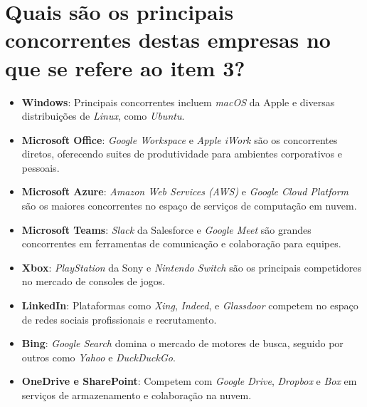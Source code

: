 \section{Quais são os principais concorrentes destas empresas no que se refere ao item 3?}

\begin{itemize}
    \item \textbf{Windows}: Principais concorrentes incluem \textit{macOS} da Apple e diversas distribuições de \textit{Linux}, como \textit{Ubuntu}.
    \item \textbf{Microsoft Office}: \textit{Google Workspace} e \textit{Apple iWork} são os concorrentes diretos, oferecendo suites de produtividade para ambientes corporativos e pessoais.
    \item \textbf{Microsoft Azure}: \textit{Amazon Web Services (AWS)} e \textit{Google Cloud Platform} são os maiores concorrentes no espaço de serviços de computação em nuvem.
    \item \textbf{Microsoft Teams}: \textit{Slack} da Salesforce e \textit{Google Meet} são grandes concorrentes em ferramentas de comunicação e colaboração para equipes.
    \item \textbf{Xbox}: \textit{PlayStation} da Sony e \textit{Nintendo Switch} são os principais competidores no mercado de consoles de jogos.
    \item \textbf{LinkedIn}: Plataformas como \textit{Xing}, \textit{Indeed}, e \textit{Glassdoor} competem no espaço de redes sociais profissionais e recrutamento.
    \item \textbf{Bing}: \textit{Google Search} domina o mercado de motores de busca, seguido por outros como \textit{Yahoo} e \textit{DuckDuckGo}.
    \item \textbf{OneDrive e SharePoint}: Competem com \textit{Google Drive}, \textit{Dropbox} e \textit{Box} em serviços de armazenamento e colaboração na nuvem.
\end{itemize}
